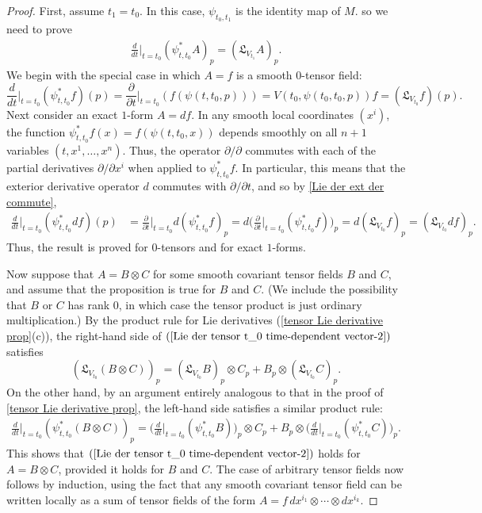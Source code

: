 \begin{proof}
First, assume $t_1=t_0$. In this case, $\psi_{t_0,t_1}$ is the identity map of $M$. so we need to prove
\begin{align}\label{Lie der tensor t_0 time-dependent vector-2}
\frac{d}{dt}\Big|_{t=t_0}(\psi_{t,t_0}^*A)_p=(\mathfrak{L}_{V_{t_1}}A)_p.
\end{align}
We begin with the special case in which $A=f$ is a smooth $0$-tensor field:
\[\frac{d}{dt}\Big|_{t=t_0}(\psi_{t,t_0}^*f)(p)=\frac{\partial}{\partial t}\Big|_{t=t_0}(f(\psi(t,t_0,p)))=V(t_0,\psi(t_0,t_0,p))f=(\mathfrak{L}_{V_{t_0}}f)(p).\]
Next consider an exact $1$-form $A=df$. In any smooth local coordinates $(x^i)$, the function $\psi^*_{t,t_0}f(x)=f(\psi(t,t_0,x))$ depends smoothly on all $n+1$ variables $(t,x^1,\dots,x^n)$. Thus, the operator $\partial/\partial$ commutes with each of the partial derivatives $\partial/\partial x^i$ when applied to $\psi^*_{t,t_0}f$. In particular, this means that the exterior derivative operator $d$ commutes with $\partial/\partial t$, and so by \cref{Lie der ext der commute},
\begin{align*}
\frac{d}{dt}\Big|_{t=t_0}(\psi_{t,t_0}^*df)(p)&=\frac{\partial}{\partial t}\Big|_{t=t_0}d(\psi_{t,t_0}^*f)_p=d\Big(\frac{\partial}{\partial t}\Big|_{t=t_0}(\psi^*_{t,t_0}f)\Big)_p=d(\mathfrak{L}_{V_{t_0}}f)_p=(\mathfrak{L}_{V_{t_0}}df)_p.
\end{align*}
Thus, the result is proved for $0$-tensors and for exact $1$-forms.\par
Now suppose that $A=B\otimes C$ for some smooth covariant tensor fields $B$ and $C$, and assume that the proposition is true for $B$ and $C$. (We include the possibility that $B$ or $C$ has rank $0$, in which case the tensor product is just ordinary multiplication.) By the product rule for Lie derivatives (\cref{tensor Lie derivative prop}(c)), the right-hand side of $(\ref{Lie der tensor t_0 time-dependent vector-2})$ satisfies
\[(\mathfrak{L}_{V_{t_0}}(B\otimes C))_p=(\mathfrak{L}_{V_{t_0}}B)_p\otimes C_p+B_p\otimes(\mathfrak{L}_{V_{t_0}}C)_p.\]
On the other hand, by an argument entirely analogous to that in the proof of \cref{tensor Lie derivative prop}, the left-hand side satisfies a similar product rule:
\begin{align*}
\frac{d}{dt}\Big|_{t=t_0}(\psi_{t,t_0}^*(B\otimes C))_p=\Big(\frac{d}{dt}\Big|_{t=t_0}(\psi_{t,t_0}^*B)\Big)_p\otimes C_p+B_p\otimes\Big(\frac{d}{dt}\Big|_{t=t_0}(\psi_{t,t_0}^*C)\Big)_p.
\end{align*}
This shows that $(\ref{Lie der tensor t_0 time-dependent vector-2})$ holds for $A=B\otimes C$, provided it holds for $B$ and $C$. The case of arbitrary tensor fields now follows by induction, using the fact that any smooth covariant tensor field can be written locally as a sum of tensor fields of the form $A=f\,dx^{i_1}\otimes\cdots\otimes dx^{i_k}$.\par

\end{proof}
